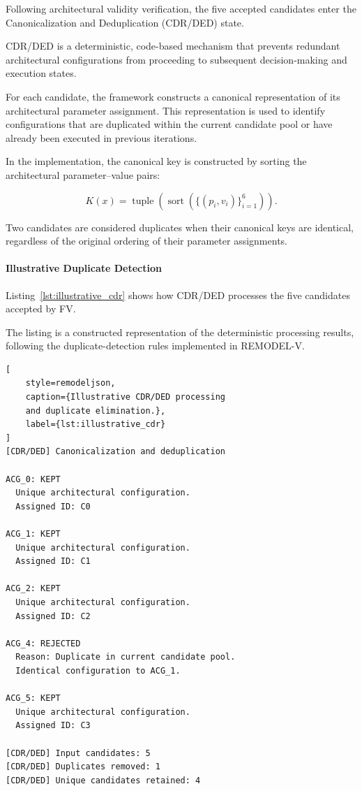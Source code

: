 Following architectural validity verification,
the five accepted candidates enter the
Canonicalization and Deduplication (CDR/DED)
state.

CDR/DED is a deterministic, code-based
mechanism that prevents redundant architectural
configurations from proceeding to subsequent
decision-making and execution states.

For each candidate, the framework constructs
a canonical representation of its architectural
parameter assignment. This representation
is used to identify configurations that
are duplicated within the current candidate
pool or have already been executed in
previous iterations.

In the implementation, the canonical key
is constructed by sorting the architectural
parameter--value pairs:

\begin{equation}
K(x) =
\operatorname{tuple}
\left(
\operatorname{sort}
\left(
\{(p_i,v_i)\}_{i=1}^{6}
\right)
\right).
\label{eq:illustrative_canonical_key}
\end{equation}

Two candidates are considered duplicates
when their canonical keys are identical,
regardless of the original ordering of
their parameter assignments.

\paragraph{Illustrative Duplicate Detection}

Listing~\ref{lst:illustrative_cdr}
shows how CDR/DED processes the five
candidates accepted by FV.

The listing is a constructed representation
of the deterministic processing results,
following the duplicate-detection rules
implemented in REMODEL-V.

\begin{lstlisting}[
    style=remodeljson,
    caption={Illustrative CDR/DED processing
    and duplicate elimination.},
    label={lst:illustrative_cdr}
]
[CDR/DED] Canonicalization and deduplication

ACG_0: KEPT
  Unique architectural configuration.
  Assigned ID: C0

ACG_1: KEPT
  Unique architectural configuration.
  Assigned ID: C1

ACG_2: KEPT
  Unique architectural configuration.
  Assigned ID: C2

ACG_4: REJECTED
  Reason: Duplicate in current candidate pool.
  Identical configuration to ACG_1.

ACG_5: KEPT
  Unique architectural configuration.
  Assigned ID: C3

[CDR/DED] Input candidates: 5
[CDR/DED] Duplicates removed: 1
[CDR/DED] Unique candidates retained: 4
\end{lstlisting}

